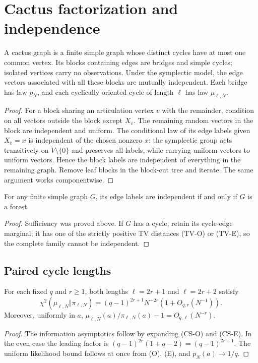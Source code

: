 \section{Cactus factorization and independence}\label{sec:cactus}
\begin{theorem}\label{thm:cactus}
A cactus graph is a finite simple graph whose distinct cycles have at
most one common vertex. Its blocks containing edges are bridges and simple
cycles; isolated vertices carry no observations.
Under the symplectic model, the edge vectors associated with all these
blocks are mutually independent. Each bridge has law $p_N$, and each
cyclically oriented cycle of length $\ell$ has law $\mu_{\ell,N}$.

\end{theorem}
\begin{proof}
For a block sharing an articulation vertex $v$ with the remainder,
condition on all vectors outside the block except $X_v$.
The remaining random vectors in the block are independent and uniform.
The conditional law of its edge labels given $X_v=x$ is independent of
the chosen nonzero $x$: the symplectic group acts transitively on
$V\setminus\{0\}$ and preserves all labels, while carrying uniform
vectors to uniform vectors. Hence the block labels are independent of
everything in the remaining graph. Remove leaf blocks in the block-cut
tree and iterate. The same argument works componentwise.
\end{proof}

\begin{corollary}\label{cor:forest}
For any finite simple graph $G$, its edge labels are independent if and
only if $G$ is a forest.
\end{corollary}
\begin{proof}
Sufficiency was proved above. If $G$ has a cycle,
retain its cycle-edge marginal; it has one of the strictly positive TV
distances (TV-O) or (TV-E), so the complete family cannot be independent.
\end{proof}

\subsection{Paired cycle lengths}
\begin{corollary}\label{cor:paired}
For each fixed $q$ and $r\ge1$, both lengths
$\ell=2r+1$ and $\ell=2r+2$ satisfy
\[
 \chi^2(\mu_{\ell,N}\Vert\pi_{\ell,N})
 =(q-1)^{2r+1}N^{-2r}(1+O_{q,r}(N^{-1})).
\]
Moreover, uniformly in $a$,
$\mu_{\ell,N}(a)/\pi_{\ell,N}(a)-1=O_{q,\ell}(N^{-r})$.
\end{corollary}
\begin{proof}
The information asymptotics follow by expanding (CS-O) and (CS-E). In the even case the leading factor is $(q-1)^{2r}(1+q-2)=(q-1)^{2r+1}$.
The uniform likelihood bound follows at once from (O), (E), and $p_N(a)\to1/q$.
\end{proof}

